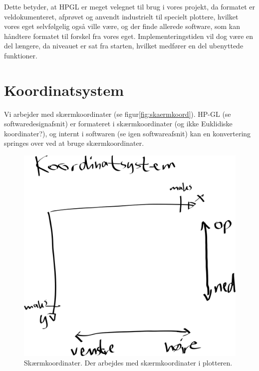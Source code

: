 
Dette betyder, at HPGL er meget velegnet til brug i vores projekt, da
formatet er veldokumenteret, afprøvet og anvendt industrielt til
specielt plottere, hvilket vores eget selvfølgelig også ville være, og
der finde allerede software, som kan håndtere formatet til forskel fra
vores eget. Implementeringstiden vil dog være en del længere, da
niveauet er sat fra starten, hvilket medfører en del ubenyttede
funktioner.


\section{Koordinatsystem}


Vi arbejder med skærmkoordinater (se
figur\vref{fig:skaermkoord}). HP-GL (se
softwaredesignafsnit) er formateret i
skærmkoordinater (og ikke Euklidiske koordinater?),
og internt i softwaren (se igen
softwareafsnit) kan en konvertering
springes over ved at bruge skærmkoordinater.

\begin{figure}[htbp]
  \centering
  \includegraphics[width=\textwidth]{../brugere/kjaergaard/skaermkoordinater}
  \caption{Skærmkoordinater. Der arbejdes med skærmkoordinater i
    plotteren.}
  \label{fig:skaermkoord}
\end{figure}

